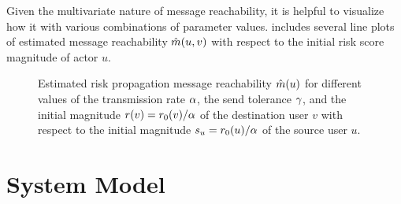 Given the multivariate nature of message reachability, it is helpful to visualize how it with various combinations of parameter values.  includes several line plots of estimated message reachability $\hat{m}(u, v)$ with respect to the initial risk score magnitude of actor $u$.

\begin{figure}[htbp]
\centering
{}
\caption[Estimated risk propagation message reachability]{Estimated risk propagation message reachability $\hat{m}(u)$ for different values of the transmission rate $\alpha$, the send tolerance $\gamma$, and the initial magnitude $r(v) = r_0(v) / \alpha$ of the destination user $v$ with respect to the initial magnitude $s_u = r_0(u) / \alpha$ of the source user $u$.}
\label{fig:reach}
\end{figure}


\section{System Model}\label{sec:system-model}

